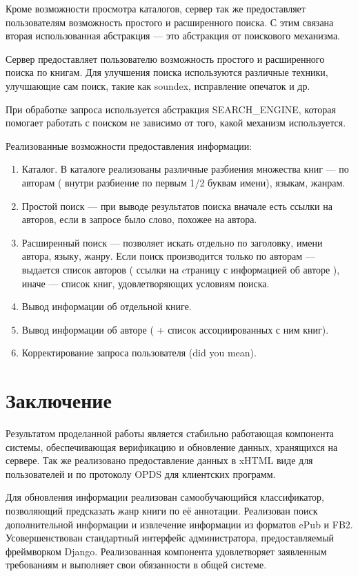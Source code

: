 \documentclass[a4paper]{report}
\begin{document}
Кроме возможности просмотра каталогов, сервер так же предоставляет пользователям возможность простого и расширенного поиска. С этим связана вторая использованная абстракция --- это абстракция от поискового механизма. 

Сервер предоставляет пользователю возможность простого и расширенного поиска по книгам. Для улучшения поиска используются различные техники, улучшающие сам поиск, такие как soundex, исправление опечаток и др. %

При обработке запроса используется абстракция SEARCH\_ENGINE, которая помогает работать с поиском не зависимо от того, какой механизм используется.

Реализованные возможности предоставления информации:
\begin{enumerate}
	\item Каталог. В каталоге реализованы различные разбиения множества книг --- по авторам ( внутри разбиение по первым 1/2 буквам имени), языкам, жанрам.
	\item Простой поиск --- при выводе результатов поиска вначале есть ссылки на авторов, если в запросе было слово, похожее на автора.
	\item Расширенный поиск --- позволяет искать отдельно по заголовку, имени автора, языку, жанру. Если поиск производится только по авторам --- выдается список авторов ( ссылки на cтраницу с информацией об авторе ), иначе --- список книг, удовлетворяющих условиям поиска.
\item Вывод информации об отдельной книге.
\item Вывод информации об авторе ( + список ассоциированных с ним книг).
\item Корректирование запроса пользователя (did you mean).
\end{enumerate}


\newpage
\section{Заключение}

Результатом проделанной работы является стабильно работающая компонента системы, обеспечивающая верификацию и обновление данных, хранящихся на сервере. Так же реализовано предоставление данных в xHTML виде для пользователей и по протоколу OPDS для клиентских программ. 

Для обновления информации реализован самообучающийся классификатор, позволяющий предсказать жанр книги по её аннотации. Реализован поиск дополнительной информации и извлечение информации из форматов ePub и FB2. Усовершенствован стандартный интерфейс администратора, предоставляемый фреймворком Django. Реализованная компонента удовлетворяет заявленным требованиям и выполняет свои обязанности в общей системе. 
\end{document}
